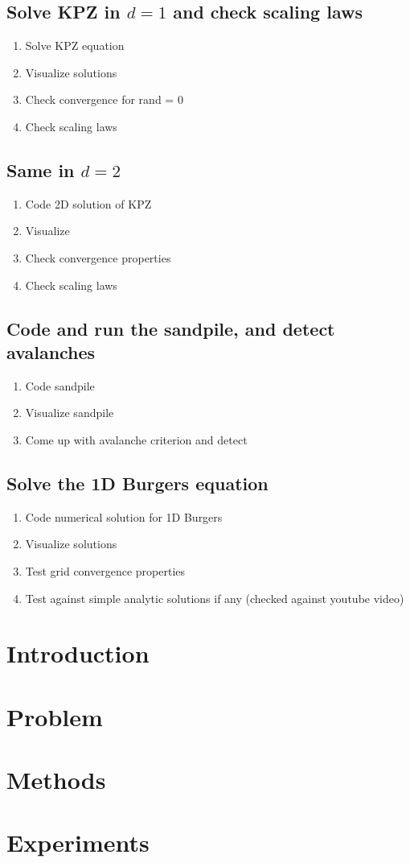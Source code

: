 \documentclass[12pt]{article}
\begin{document}
\subsection{Solve KPZ in $d = 1$ and check scaling laws}
\begin{enumerate}
\item Solve KPZ equation \checked
\item Visualize solutions \checked
\item Check convergence for rand = 0 
\item Check scaling laws
\end{enumerate}

\subsection{Same in $d = 2$}
\begin{enumerate}
\item Code 2D solution of KPZ \checked
\item Visualize \checked
\item Check convergence properties
\item Check scaling laws
\end{enumerate}

\subsection{Code and run the sandpile, and detect avalanches}
\begin{enumerate}
\item Code sandpile
\item Visualize sandpile
\item Come up with avalanche criterion and detect
\end{enumerate}

\subsection{Solve the 1D Burgers equation \checked}

\begin{enumerate}
\item Code numerical solution for 1D Burgers \checked 
\item Visualize solutions \checked 
\item Test grid convergence properties \checked
\item Test against simple analytic solutions if any (checked against youtube video) \checked
\end{enumerate}


\section{Introduction}

\section{Problem}

\section{Methods}

\section{Experiments}
\end{document}
